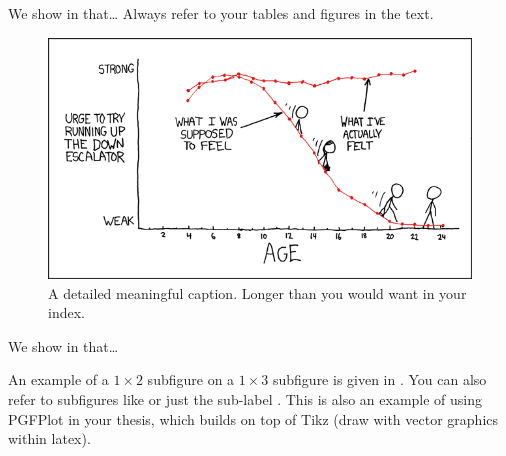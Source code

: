 We show in  that\dots
Always refer to your tables and figures in the text.

\begin{figure}[!t]
  \includegraphics[width=0.5\linewidth]{figures/escalators.png}
  \caption[Short caption for the index]{A detailed meaningful caption. Longer than you would want in your index.}
  \label{fig:your_label}
\end{figure}%
We show in  that\dots

An example of a $1\times 2$ subfigure on a $1\times 3$ subfigure is given in . You can also refer to subfigures like  or just the sub-label . This is also an example of using PGFPlot in your thesis, which builds on top of Tikz (draw with vector graphics within latex).

